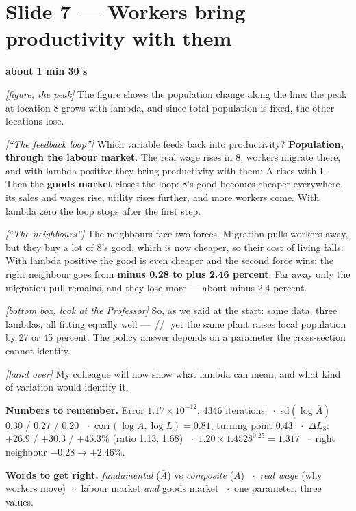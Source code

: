 \documentclass[11pt,a4paper]{article}
\newcommand{\slide}[2]{\Needspace{10\baselineskip}\section{#1}\textcolor{unicared}{\small\bfseries #2}\par}
\newcommand{\cue}[1]{{\small\itshape\color{unicared}[#1]}}
\newcommand{\pause}{\textcolor{unicared}{\,/\!/\,}}
\begin{document}
\slide{Slide 7 --- Workers bring productivity with them}{about 1 min 30 s}
\begin{say}
\cue{figure, the peak} The figure shows the population change along the line: the peak at location 8 grows with lambda, and since total population is fixed, the other locations lose.

\cue{``The feedback loop''} Which variable feeds back into productivity? \textbf{Population, through the labour market}. The real wage rises in 8, workers migrate there, and with lambda positive they bring productivity with them: A rises with L. Then the \textbf{goods market} closes the loop: 8's good becomes cheaper everywhere, its sales and wages rise, utility rises further, and more workers come. With lambda zero the loop stops after the first step.

\cue{``The neighbours''} The neighbours face two forces. Migration pulls workers away, but they buy a lot of 8's good, which is now cheaper, so their cost of living falls. With lambda positive the good is even cheaper and the second force wins: the right neighbour goes from \textbf{minus 0.28 to plus 2.46 percent}. Far away only the migration pull remains, and they lose more --- about minus 2.4 percent.

\cue{bottom box, look at the Professor} So, as we said at the start: same data, three lambdas, all fitting equally well --- \pause\ yet the same plant raises local population by 27 or 45 percent. The policy answer depends on a parameter the cross-section cannot identify.

\cue{hand over} My colleague will now show what lambda can mean, and what kind of variation would identify it.
\end{say}

\vspace{6pt}
\begin{tcolorbox}[colback=tint,colframe=tint,arc=0pt]
\small\textbf{Numbers to remember.} Error $1.17\times10^{-12}$, 4346 iterations \ $\cdot$\ sd$(\log\bar A)$ 0.30 / 0.27 / 0.20 \ $\cdot$\ corr$(\log A,\log L)=0.81$, turning point 0.43 \ $\cdot$\ $\Delta L_8$: $+26.9$ / $+30.3$ / $+45.3\%$ (ratio 1.13, 1.68) \ $\cdot$\ $1.20\times1.4528^{0.25}=1.317$ \ $\cdot$\ right neighbour $-0.28\to+2.46\%$.

\textbf{Words to get right.} \emph{fundamental} ($\bar A$) vs \emph{composite} ($A$) \ $\cdot$\ \emph{real wage} (why workers move) \ $\cdot$\ labour market \emph{and} goods market \ $\cdot$\ one parameter, three values.
\end{tcolorbox}
\end{document}
